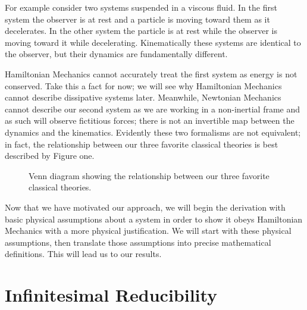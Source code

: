 \documentclass{article}[a4paper]
\begin{document}
	For example consider two systems suspended in a viscous fluid. In the first system the observer is at rest and a particle is moving toward them as it decelerates. In the other system the particle is at rest while the observer is moving toward it while decelerating. Kinematically these systems are identical to the observer, but their dynamics are fundamentally different.
	
	Hamiltonian Mechanics cannot accurately treat the first system as energy is not conserved. Take this a fact for now; we will see why Hamiltonian Mechanics cannot describe dissipative systems later. Meanwhile, Newtonian Mechanics cannot describe our second system as we are working in a non-inertial frame and as such will observe fictitious forces; there is not an invertible map between the dynamics and the kinematics. Evidently these two formalisms are not equivalent; in fact, the relationship between our three favorite classical theories is best described by Figure one. 	
	 
\begin{figure}[!!ht]
\begin{center}
\end{center}
\caption{Venn diagram showing the relationship between our three favorite classical theories.}
\end{figure}

 Now that we have motivated our approach, we will begin the derivation with basic physical assumptions about a system in order to show it obeys Hamiltonian Mechanics with a more physical justification. We will start with these physical assumptions, then translate those assumptions into precise mathematical definitions. This will lead us to our results.

\section{Infinitesimal Reducibility}
	
\end{document}
